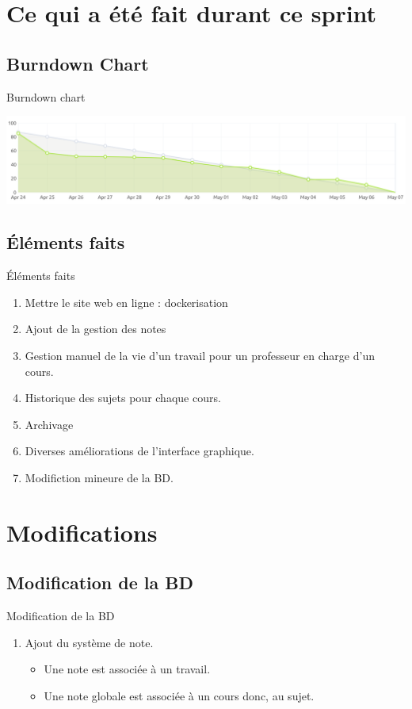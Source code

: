\documentclass[numbering=fraction]{beamer}
\begin{document}
\section{Ce qui a été fait durant ce sprint}
\subsection{Burndown Chart}
\begin{frame}{Burndown chart}
    \centering
    
    \includegraphics[width=1.1\textwidth]{burndownChart.png} 
\end{frame}
\subsection{Éléments faits}
\begin{frame}{Éléments faits}
   \begin{enumerate}
    \item Mettre le site web en ligne : dockerisation
    \item Ajout de la gestion des notes
    \item Gestion manuel de la vie d'un travail pour un professeur en charge d'un cours.
    \item Historique des sujets pour chaque cours.
    \item Archivage
    \item Diverses améliorations de l'interface graphique.
    \item Modifiction mineure de la BD.
   \end{enumerate}

\end{frame}
\section{Modifications}
\subsection{Modification de la BD}
\begin{frame}{Modification de la BD}
    \begin{enumerate}
        \item Ajout du système de note.
        \begin{itemize}
            \item Une note est associée à un travail.
            \item Une note globale est associée à un cours donc, au sujet.
        \end{itemize}
    \end{enumerate}
\end{frame}
\end{document}
